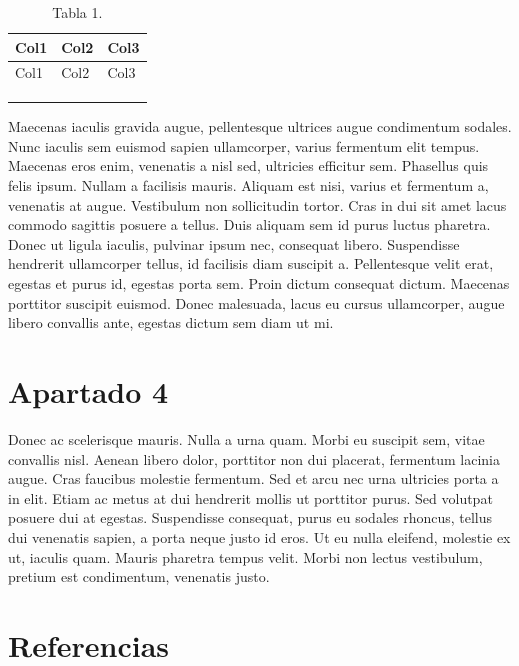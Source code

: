 \documentclass[
]{interact}
\begin{document}
\begin{longtable}[]{@{}lll@{}}
\caption{Tabla 1.}\tabularnewline
\toprule\noalign{}
Col1 & Col2 & Col3 \\
\midrule\noalign{}
\endfirsthead
\toprule\noalign{}
Col1 & Col2 & Col3 \\
\midrule\noalign{}
\endhead
\bottomrule\noalign{}
\endlastfoot
& & \\
& & \\
& & \\
\end{longtable}

Maecenas iaculis gravida augue, pellentesque ultrices augue condimentum
sodales. Nunc iaculis sem euismod sapien ullamcorper, varius fermentum
elit tempus. Maecenas eros enim, venenatis a nisl sed, ultricies
efficitur sem. Phasellus quis felis ipsum. Nullam a facilisis mauris.
Aliquam est nisi, varius et fermentum a, venenatis at augue. Vestibulum
non sollicitudin tortor. Cras in dui sit amet lacus commodo sagittis
posuere a tellus. Duis aliquam sem id purus luctus pharetra. Donec ut
ligula iaculis, pulvinar ipsum nec, consequat libero. Suspendisse
hendrerit ullamcorper tellus, id facilisis diam suscipit a. Pellentesque
velit erat, egestas et purus id, egestas porta sem. Proin dictum
consequat dictum. Maecenas porttitor suscipit euismod. Donec malesuada,
lacus eu cursus ullamcorper, augue libero convallis ante, egestas dictum
sem diam ut mi.

\section{Apartado 4}\label{apartado-4}

Donec ac scelerisque mauris. Nulla a urna quam. Morbi eu suscipit sem,
vitae convallis nisl. Aenean libero dolor, porttitor non dui placerat,
fermentum lacinia augue. Cras faucibus molestie fermentum. Sed et arcu
nec urna ultricies porta a in elit. Etiam ac metus at dui hendrerit
mollis ut porttitor purus. Sed volutpat posuere dui at egestas.
Suspendisse consequat, purus eu sodales rhoncus, tellus dui venenatis
sapien, a porta neque justo id eros. Ut eu nulla eleifend, molestie ex
ut, iaculis quam. Mauris pharetra tempus velit. Morbi non lectus
vestibulum, pretium est condimentum, venenatis justo.

\section{Referencias}\label{referencias}
\end{document}
